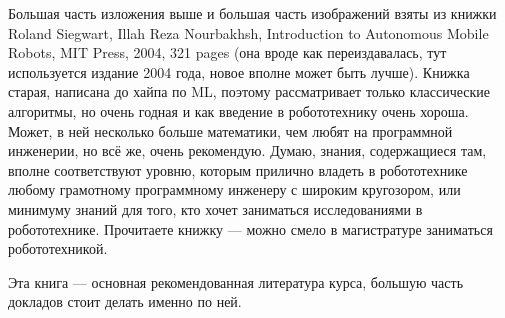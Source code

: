 \documentclass{../../text-style}
\begin{document}
Большая часть изложения выше и большая часть изображений взяты из книжки Roland Siegwart, Illah Reza Nourbakhsh, Introduction to Autonomous Mobile Robots, MIT Press, 2004, 321 pages (она вроде как переиздавалась, тут используется издание 2004 года, новое вполне может быть лучше). Книжка старая, написана до хайпа по ML, поэтому рассматривает только классические алгоритмы, но очень годная и как введение в робототехнику очень хороша. Может, в ней несколько больше математики, чем любят на программной инженерии, но всё же, очень рекомендую. Думаю, знания, содержащиеся там, вполне соответствуют уровню, которым прилично владеть в робототехнике любому грамотному программному инженеру с широким кругозором, или минимуму знаний для того, кто хочет заниматься исследованиями в робототехнике. Прочитаете книжку --- можно смело в магистратуре заниматься робототехникой.

Эта книга --- основная рекомендованная литература курса, большую часть докладов стоит делать именно по ней.
\end{document}
